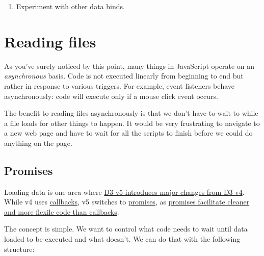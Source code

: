 \documentclass[openany]{book}
\providecommand{\tightlist}{%
  \setlength{\itemsep}{0pt}\setlength{\parskip}{0pt}}
\begin{document}
\begin{enumerate}
\def\labelenumi{\arabic{enumi}.}
\setcounter{enumi}{2}
\tightlist
\item
  Experiment with other data binds.
\end{enumerate}

\hypertarget{reading-files}{%
\chapter{Reading files }\label{reading-files}}

As you've surely noticed by this point, many things in JavaScript operate on an \emph{asynchronous} basis. Code is not executed linearly from beginning to end but rather in response to various triggers. For example, event listeners behave asynchronously: code will execute only if a mouse click event occurs.

The benefit to reading files asynchronously is that we don't have to wait to while a file loads for other things to happen. It would be very frustrating to navigate to a new web page and have to wait for all the scripts to finish before we could do anything on the page.

\hypertarget{promises}{%
\section{Promises}\label{promises}}

Loading data is one area where \href{https://github.com/d3/d3/blob/master/CHANGES.md}{D3 v5 introduces major changes from D3 v4}. While v4 uses \href{https://javascript.info/callbacks}{callbacks}, v5 switches to \href{https://javascript.info/promise-basics}{promises}, as \href{https://hiddentao.com/archives/2014/04/21/why-promises-are-more-flexible-than-callbacks}{promises facilitate cleaner and more flexile code than callbacks}.

The concept is simple. We want to control what code needs to wait until data loaded to be executed and what doesn't. We can do that with the following structure:
\end{document}
